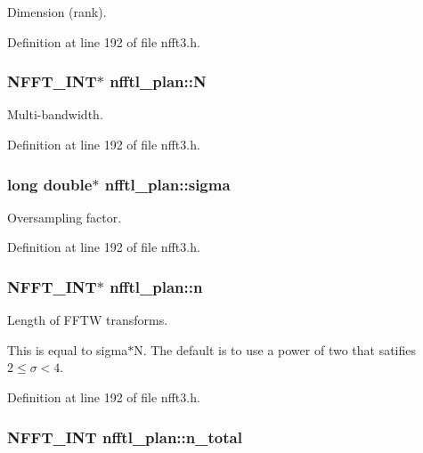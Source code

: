 Dimension (rank). 



Definition at line 192 of file nfft3.\-h.

\hypertarget{structnfftl__plan_a4444859ed07357dd2694328980d49e82}{
\subsubsection[{N}]{\setlength{\rightskip}{0pt plus 5cm}N\-F\-F\-T\-\_\-\-I\-N\-T$\ast$ nfftl\-\_\-plan\-::\-N}}\label{structnfftl__plan_a4444859ed07357dd2694328980d49e82}


Multi-\/bandwidth. 



Definition at line 192 of file nfft3.\-h.

\hypertarget{structnfftl__plan_a149fdaed10fafdb3bf414110ad233b7c}{
\subsubsection[{sigma}]{\setlength{\rightskip}{0pt plus 5cm}long double$\ast$ nfftl\-\_\-plan\-::sigma}}\label{structnfftl__plan_a149fdaed10fafdb3bf414110ad233b7c}


Oversampling factor. 



Definition at line 192 of file nfft3.\-h.

\hypertarget{structnfftl__plan_af0a743414fedce17f278084b97110dfb}{
\subsubsection[{n}]{\setlength{\rightskip}{0pt plus 5cm}N\-F\-F\-T\-\_\-\-I\-N\-T$\ast$ nfftl\-\_\-plan\-::n}}\label{structnfftl__plan_af0a743414fedce17f278084b97110dfb}


Length of F\-F\-T\-W transforms. 

This is equal to sigma$\ast$\-N. The default is to use a power of two that satifies $2\le\sigma<4$. 

Definition at line 192 of file nfft3.\-h.

\hypertarget{structnfftl__plan_afbc61ba78ca220fc8d6c72624772f991}{
\subsubsection[{n\-\_\-total}]{\setlength{\rightskip}{0pt plus 5cm}N\-F\-F\-T\-\_\-\-I\-N\-T nfftl\-\_\-plan\-::n\-\_\-total}}\label{structnfftl__plan_afbc61ba78ca220fc8d6c72624772f991}


